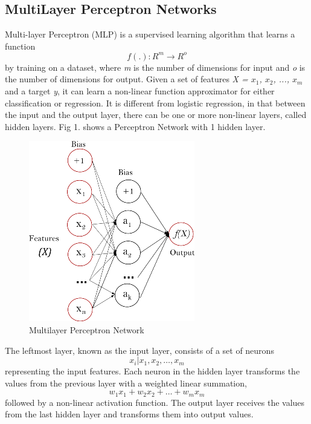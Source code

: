 \documentclass[a4paper, 10pt, conference]{IEEEtran}
\begin{document}
\subsection{MultiLayer Perceptron Networks}
Multi-layer Perceptron (MLP) is a supervised learning algorithm that learns a function \[ f(.): R^{m} \rightarrow R^{o} \] by training on a dataset, where \textit{m} is the number of dimensions for input and \textit{o} is the number of dimensions for output. Given a set of features \textit{X = $x_{1}$, $x_{2}$, ..., $x_{m}$} and a target \textit{y}, it can learn a non-linear function approximator for either classification or regression. It is different from logistic regression, in that between the input and the output layer, there can be one or more non-linear layers, called hidden layers. Fig 1. shows a Perceptron Network with 1 hidden layer.
\begin{figure}
  \includegraphics[width=\linewidth]{MLP.png}
  \caption{Multilayer Perceptron Network}
  \label{fig:mlp}
\end{figure}

The leftmost layer, known as the input layer, consists of a set of neurons \[ {x_{i}|x_{1},x_{2},\ldots,x_{m}} \] representing the input features. Each neuron in the hidden layer transforms the values from the previous layer with a weighted linear summation, \[ w_{1}x_{1} + w_{2}x_{2} + \ldots + w_{m}x_{m} \]
followed by a non-linear activation function. The output layer receives the values from the last hidden layer and transforms them into output values.
\end{document}
